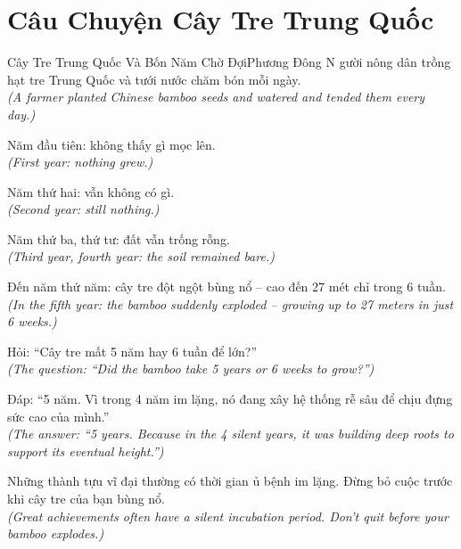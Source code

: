 \section{Câu Chuyện Cây Tre Trung Quốc}
\begin{truyen}{Cây Tre Trung Quốc Và Bốn Năm Chờ Đợi}{Phương Đông}
N gười nông dân trồng hạt tre Trung Quốc và tưới nước chăm bón mỗi ngày.\\
\textit{(A farmer planted Chinese bamboo seeds and watered and tended them every day.)}

Năm đầu tiên: không thấy gì mọc lên.\\
\textit{(First year: nothing grew.)}

Năm thứ hai: vẫn không có gì.\\
\textit{(Second year: still nothing.)}

Năm thứ ba, thứ tư: đất vẫn trống rỗng.\\
\textit{(Third year, fourth year: the soil remained bare.)}

Đến năm thứ năm: cây tre đột ngột bùng nổ -- cao đến 27 mét chỉ trong 6 tuần.\\
\textit{(In the fifth year: the bamboo suddenly exploded -- growing up to 27 meters in just 6 weeks.)}

Hỏi: ``Cây tre mất 5 năm hay 6 tuần để lớn?''\\
\textit{(The question: ``Did the bamboo take 5 years or 6 weeks to grow?'')}

Đáp: ``5 năm. Vì trong 4 năm im lặng, nó đang xây hệ thống rễ sâu để chịu đựng sức cao của mình.''\\
\textit{(The answer: ``5 years. Because in the 4 silent years, it was building deep roots to support its eventual height.'')}

\end{truyen}
\begin{baihoc}
  Những thành tựu vĩ đại thường có thời gian ủ bệnh im lặng. Đừng bỏ cuộc trước khi cây tre của bạn bùng nổ.\\
  \textit{(Great achievements often have a silent incubation period. Don't quit before your bamboo explodes.)}
\end{baihoc}

